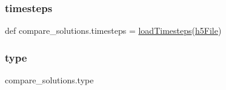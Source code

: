 \subsubsection{\texorpdfstring{timesteps}{timesteps}}
{\footnotesize\ttfamily def compare\+\_\+solutions.\+timesteps = \mbox{\hyperlink{namespacecompare__solutions_a027a643ca4b78f4096ae7c990da396d4}{load\+Timesteps}}(\mbox{\hyperlink{namespacecompare__solutions_a9aff00b9f52225aceb635bcc6230e32c}{h5\+File}})}

\mbox{\label{namespacecompare__solutions_a90f6d241dd840b9ca87fadfda12072a8}} 
\subsubsection{\texorpdfstring{type}{type}}
{\footnotesize\ttfamily compare\+\_\+solutions.\+type}

